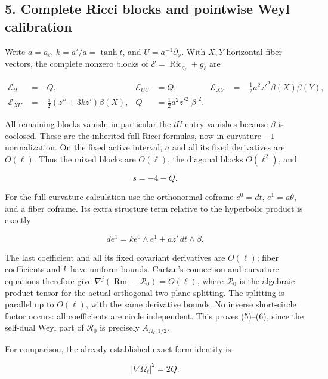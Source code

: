 \documentclass[
  11pt,
]{article}
\begin{document}
\hypertarget{complete-ricci-blocks-and-pointwise-weyl-calibration}{%
\subsection{5. Complete Ricci blocks and pointwise Weyl
calibration}\label{complete-ricci-blocks-and-pointwise-weyl-calibration}}

Write \(a=a_\ell\), \(k=a'/a=\tanh t\), and \(U=a^{-1}\partial_\phi\).
With \(X,Y\) horizontal fiber vectors, the complete nonzero blocks of
\(\mathcal E=\operatorname{Ric}_{g_\ell}+g_\ell\) are

\[
 \begin{aligned}
 \mathcal E_{tt}&=-Q,& \mathcal E_{UU}&=Q,&
 \mathcal E_{XY}&=-\tfrac12a^2z'^2\beta(X)\beta(Y),\\
 \mathcal E_{XU}&=-\tfrac a2(z''+3kz')\beta(X),&
 Q&=\tfrac12a^2z'^2|\beta|^2.
 \end{aligned}
 \tag{20}
\]

All remaining blocks vanish; in particular the \(tU\) entry vanishes
because \(\beta\) is coclosed. These are the inherited full Ricci
formulas, now in curvature \(-1\) normalization. On the fixed active
interval, \(a\) and all its fixed derivatives are \(O(\ell)\). Thus the
mixed blocks are \(O(\ell)\), the diagonal blocks \(O(\ell^2)\), and

\[
 s=-4-Q.
 \tag{21}
\]

For the full curvature calculation use the orthonormal coframe
\(e^0=dt\), \(e^1=a\theta\), and a fiber coframe. Its extra structure
term relative to the hyperbolic product is exactly

\[
 de^1=k e^0\wedge e^1+a z'\,dt\wedge\beta.
 \tag{22}
\]

The last coefficient and all its fixed covariant derivatives are
\(O(\ell)\); fiber coefficients and \(k\) have uniform bounds. Cartan's
connection and curvature equations therefore give
\(\nabla^j(\operatorname{Rm}-\mathcal R_0)=O(\ell)\), where
\(\mathcal R_0\) is the algebraic product tensor for the actual
orthogonal two-plane splitting. The splitting is parallel up to
\(O(\ell)\), with the same derivative bounds. No inverse short-circle
factor occurs: all coefficients are circle independent. This proves
(5)--(6), since the self-dual Weyl part of \(\mathcal R_0\) is precisely
\(A_{\Omega_\ell,1/2}\).

For comparison, the already established exact form identity is

\[
 |\nabla\Omega_\ell|^2=2Q.
 \tag{23}
\]
\end{document}

